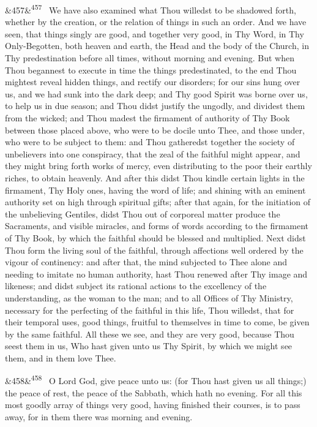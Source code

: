 \documentclass[12pt]{article}
\newcommand{\para}[1][]{\par\noindent\ifx&#1&\else\textsuperscript{\footnotesize #1}~\fi}
\begin{document}
\para[457] We have also examined what Thou willedst to be shadowed forth, whether by the creation, or the relation of things in such an order. And we have seen, that things singly are good, and together very good, in Thy Word, in Thy Only-Begotten, both heaven and earth, the Head and the body of the Church, in Thy predestination before all times, without morning and evening. But when Thou begannest to execute in time the things predestinated, to the end Thou mightest reveal hidden things, and rectify our disorders; for our sins hung over us, and we had sunk into the dark deep; and Thy good Spirit was borne over us, to help us in due season; and Thou didst justify the ungodly, and dividest them from the wicked; and Thou madest the firmament of authority of Thy Book between those placed above, who were to be docile unto Thee, and those under, who were to be subject to them: and Thou gatheredst together the society of unbelievers into one conspiracy, that the zeal of the faithful might appear, and they might bring forth works of mercy, even distributing to the poor their earthly riches, to obtain heavenly. And after this didst Thou kindle certain lights in the firmament, Thy Holy ones, having the word of life; and shining with an eminent authority set on high through spiritual gifts; after that again, for the initiation of the unbelieving Gentiles, didst Thou out of corporeal matter produce the Sacraments, and visible miracles, and forms of words according to the firmament of Thy Book, by which the faithful should be blessed and multiplied. Next didst Thou form the living soul of the faithful, through affections well ordered by the vigour of continency: and after that, the mind subjected to Thee alone and needing to imitate no human authority, hast Thou renewed after Thy image and likeness; and didst subject its rational actions to the excellency of the understanding, as the woman to the man; and to all Offices of Thy Ministry, necessary for the perfecting of the faithful in this life, Thou willedst, that for their temporal uses, good things, fruitful to themselves in time to come, be given by the same faithful. All these we see, and they are very good, because Thou seest them in us, Who hast given unto us Thy Spirit, by which we might see them, and in them love Thee.

\para[458] O Lord God, give peace unto us: (for Thou hast given us all things;) the peace of rest, the peace of the Sabbath, which hath no evening. For all this most goodly array of things very good, having finished their courses, is to pass away, for in them there was morning and evening.
\end{document}
